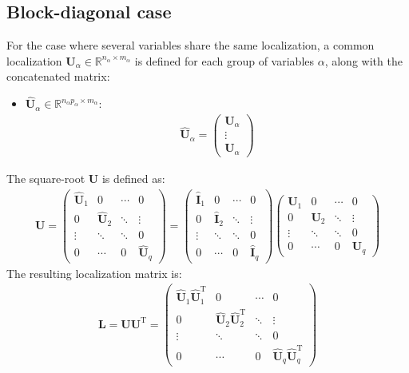 \documentclass[12pt]{scrartcl}
\begin{document}
\subsection{Block-diagonal case}
For the case where several variables share the same localization, a common localization $\mathbf{U}_\alpha \in \mathbb{R}^{n_\alpha \times m_\alpha}$ is defined for each group of variables $\alpha$, along with the concatenated matrix:
\begin{itemize}
\item $\widehat{\mathbf{U}}_\alpha \in \mathbb{R}^{n_\alpha p_\alpha \times m_\alpha}$:
\begin{align}
\widehat{\mathbf{U}}_\alpha = \left( \begin{array}{c}
\mathbf{U}_\alpha\\
\vdots \\
\mathbf{U}_\alpha
\end{array} \right)
\end{align}
\end{itemize}
The square-root $\mathbf{U}$ is defined as:
\begin{align}
\mathbf{U} = \left( \begin{array}{cccc}
\widehat{\mathbf{U}}_1 & 0 & \cdots & 0 \\
0 & \widehat{\mathbf{U}}_2 & \ddots & \vdots \\
\vdots & \ddots & \ddots & 0 \\
0 & \cdots & 0 & \widehat{\mathbf{U}}_q
\end{array} \right) = \left( \begin{array}{cccc}
\widehat{\mathbf{I}}_1 & 0 & \cdots & 0 \\
0 & \widehat{\mathbf{I}}_2 & \ddots & \vdots \\
\vdots & \ddots & \ddots & 0 \\
0 & \cdots & 0 & \widehat{\mathbf{I}}_q
\end{array} \right) \left( \begin{array}{cccc}
\mathbf{U}_1 & 0 & \cdots & 0 \\
0 & \mathbf{U}_2 & \ddots & \vdots \\
\vdots & \ddots & \ddots & 0 \\
0 & \cdots & 0 & \mathbf{U}_q
\end{array} \right)
\end{align}
The resulting localization matrix is:
\begin{align}
\mathbf{L} = \mathbf{U} \mathbf{U}^\mathrm{T} = \left( \begin{array}{cccc}
\widehat{\mathbf{U}}_1 \widehat{\mathbf{U}}_1^\mathrm{T} & 0 & \cdots & 0 \\
0 & \widehat{\mathbf{U}}_2 \widehat{\mathbf{U}}_2^\mathrm{T} & \ddots & \vdots \\
\vdots & \ddots & \ddots & 0 \\
0 & \cdots & 0 & \widehat{\mathbf{U}}_q \widehat{\mathbf{U}}_q^\mathrm{T}
\end{array} \right)
\end{align}
\end{document}
